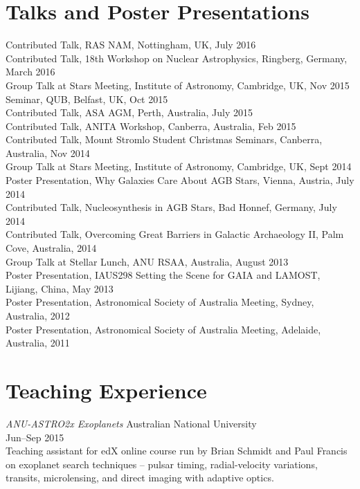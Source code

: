 \documentclass[11pt]{res} %
\begin{document}
\begin{resume}
\section{Talks and Poster Presentations}
  Contributed Talk, RAS NAM, Nottingham, UK, July 2016\\
  Contributed Talk, 18th Workshop on Nuclear Astrophysics, Ringberg, Germany, March 2016\\
  Group Talk at Stars Meeting, Institute of Astronomy, Cambridge, UK, Nov 2015\\
  Seminar, QUB, Belfast, UK, Oct 2015\\
  Contributed Talk, ASA AGM, Perth, Australia, July 2015\\
  Contributed Talk, ANITA Workshop, Canberra, Australia, Feb 2015\\
  Contributed Talk, Mount Stromlo Student Christmas Seminars, Canberra, Australia, Nov 2014\\
  Group Talk at Stars Meeting, Institute of Astronomy, Cambridge, UK, Sept 2014\\
  Poster Presentation, Why Galaxies Care About AGB Stars, Vienna, Austria, July 2014\\
  Contributed Talk, Nucleosynthesis in AGB Stars, Bad Honnef, Germany, July 2014\\
  Contributed Talk, Overcoming Great Barriers in Galactic Archaeology II, Palm Cove, Australia, 2014\\
  Group Talk at Stellar Lunch, ANU RSAA, Australia, August 2013\\
  Poster Presentation, IAUS298 Setting the Scene for GAIA and LAMOST, Lijiang, China, May 2013\\
  Poster Presentation, Astronomical Society of Australia Meeting, Sydney, Australia, 2012\\
  Poster Presentation, Astronomical Society of Australia Meeting, Adelaide, Australia, 2011

\section{Teaching Experience}
  {\it ANU-ASTRO2x Exoplanets} \hfill Australian National University\\
  \null\hfill Jun--Sep 2015\\
  Teaching assistant for edX online course run by Brian Schmidt and Paul Francis on exoplanet search techniques -- pulsar timing, radial-velocity variations, transits, microlensing, and direct imaging with adaptive optics.\\


\end{resume}
\end{document}
